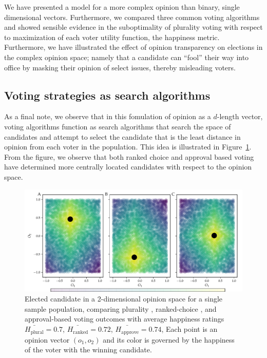 We have presented a model for a more complex opinion than binary, single dimensional vectors. Furthermore, we compared three
common voting algorithms and showed sensible evidence in the suboptimality of plurality voting with respect to maximization
of each voter utility function, the happiness metric. 
Furthermore, we have illustrated the effect of opinion transparency on elections in the complex opinion space;
namely that a candidate can ``fool'' 
their way into office by masking their opinion of select issues, thereby misleading voters.  

\subsection{Voting strategies as search algorithms}
As a final note, we observe that in this fomulation of opinion as a $d$-length vector, voting algorithms function as search algorithms
that search the space of candidates and attempt to select the candidate that is the least distance in opinion from each voter
in the population.  This idea is illustrated in Figure~\ref{fig:plurality_vs_rc_anecdotal}. From the figure, we observe that both
ranked choice and approval based voting have determined more centrally located candidates with respect to the opinion space. 
\begin{figure}
\includegraphics[width=1\textwidth]{figs/rc-gen_anecdotal_comparison-2D.pdf}\vspace{-3mm}
\caption{Elected candidate in a 2-dimensional opinion space for a single sample population, comparing plurality ,
ranked-choice , and approval-based  voting outcomes with average happiness ratings 
$\bar{H_{\mathrm{plural}}}=0.7$, $\bar{H_{\mathrm{ranked}}}=0.72$, $\bar{H_{\mathrm{approve}}}=0.74$, 
Each point is an opinion vector $(o_1, o_2)$ and its color is governed by the happiness of the voter with the winning candidate.}
\label{fig:plurality_vs_rc_anecdotal}
\end{figure}
